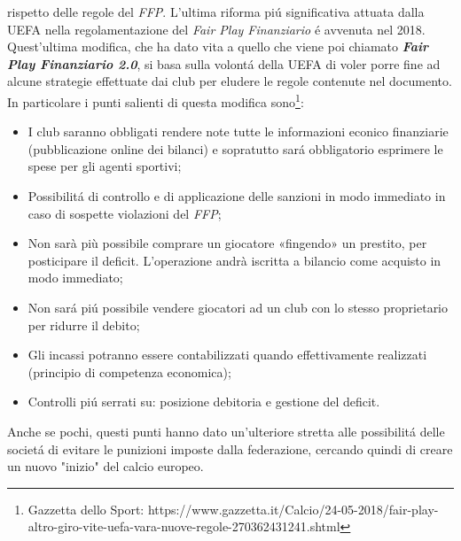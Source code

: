 \documentclass[
    corpo=12pt,
    oneside,
    evenboxes,
    tipotesi=triennale,
    stile=classica,
    oldstyle,
    autoretitolo,
    greek,
]{toptesi}
\begin{document}
\begin{interlinea}{1.5}
rispetto delle regole del \emph{FFP}.\newline
L'ultima riforma pi\'u significativa attuata dalla UEFA nella regolamentazione del \emph{Fair Play Finanziario} \'e avvenuta nel 2018.
Quest'ultima modifica, che ha dato vita a quello che viene poi chiamato \emph{\textbf{Fair Play Finanziario 2.0}}, si basa sulla volont\'a della
UEFA di voler porre fine ad alcune strategie effettuate dai club per eludere le regole contenute nel documento. In particolare i punti 
salienti di questa modifica sono\footnote{Gazzetta dello Sport: https://www.gazzetta.it/Calcio/24-05-2018/fair-play-altro-giro-vite-uefa-vara-nuove-regole-270362431241.shtml}:
\begin{itemize}
    \item I club saranno obbligati rendere note tutte le informazioni econico finanziarie (pubblicazione online dei bilanci) e 
    sopratutto sar\'a obbligatorio esprimere le spese per gli agenti sportivi;
    \item Possibilit\'a di controllo e di applicazione delle sanzioni in modo immediato in caso di sospette violazioni del \emph{FFP};
    \item Non sarà più possibile comprare un giocatore «fingendo» un prestito, per posticipare il deficit. L’operazione andrà iscritta 
    a bilancio come acquisto in modo immediato;
    \item Non sar\'a pi\'u possibile vendere giocatori ad un club con lo stesso proprietario per ridurre il debito;
    \item Gli incassi potranno essere contabilizzati quando effettivamente realizzati (principio di competenza economica);
    \item Controlli pi\'u serrati su: posizione debitoria e gestione del deficit.
\end{itemize}
Anche se pochi, questi punti hanno dato un'ulteriore stretta alle possibilit\'a delle societ\'a di evitare le punizioni imposte dalla federazione,
cercando quindi di creare un nuovo "inizio" del calcio europeo.

\end{interlinea}
\end{document}
